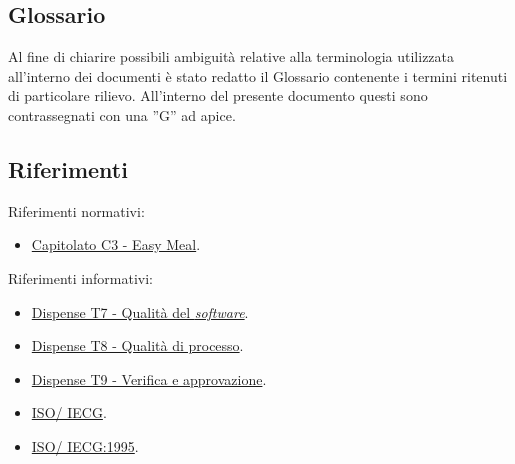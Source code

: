 \subsection{Glossario}
Al fine di chiarire possibili ambiguità relative alla terminologia utilizzata all'interno dei documenti è stato redatto il Glossario contenente i termini ritenuti di particolare rilievo.
All'interno del presente documento questi sono contrassegnati con una ”G” ad apice.

\subsection{Riferimenti}
Riferimenti normativi:
\begin{itemize}
    \item \href{https://www.math.unipd.it/~tullio/IS-1/2023/Progetto/C3.pdf}{Capitolato C3 - Easy Meal}.
\end{itemize}

\noindent
Riferimenti informativi:
\begin{itemize}
    \item \href{https://www.math.unipd.it/~tullio/IS-1/2023/Dispense/T7.pdf}{Dispense T7 - Qualità del \textit{software}}.
    \item \href{https://www.math.unipd.it/~tullio/IS-1/2023/Dispense/T8.pdf}{Dispense T8 - Qualità di processo}.
    \item
		\href{https://www.math.unipd.it/~tullio/IS-1/2023/Dispense/T9.pdf}{Dispense T9 - Verifica e approvazione}.
    \item \href{https://it.wikipedia.org/wiki/ISO/IEC_9126}{ISO\g/ IECG}.
    \item \href{https://www.math.unipd.it/~tullio/IS-1/2009/Approfondimenti/ISO_12207-1995.pdf}{ISO\g/ IECG:1995}.
\end{itemize}
